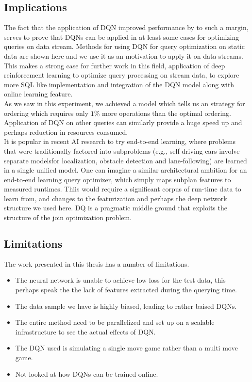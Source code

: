 \subsection{Implications}
The fact that the application of DQN improved performance by to such a margin, serves to prove that DQNs can be applied in at least some cases for optimizing queries on data stream. Methods for using DQN for query optimization on static data are shown here \cite{drl_dbms} and we use it as an motivation to apply it on data streams.  \\
This makes a strong case for further work in this field, application of deep reinforcement learning to optimize query processing on stream data, to explore more SQL like implementation and integration of the DQN model along with online learning feature.\\
As we saw in this experiment, we achieved a model which tells us an strategy for ordering which requires only $1\%$ more operations than the optimal ordering. Application of DQN on other queries can similarly provide a huge speed up and perhaps reduction in resources consumed. \\
It is popular in recent AI research to try end-to-end learning, where problems that were traditionally factored into subproblems (e.g., self-driving cars involve separate modelsfor localization, obstacle detection and lane-following) are learned in a single unified model. One can imagine a similar architectural ambition for an end-to-end learning query optimizer, which simply maps subplan features to measured runtimes. Thiis would require a significant corpus of run-time data to learn from, and changes to the featurization and perhaps the deep network structure we used here. DQ is a pragmatic middle ground that exploits the structure of the join optimization problem\cite{drl_dbms}.

\subsection{Limitations}
The work presented in this thesis has a number of limitations.
\begin{itemize}
    \item The neural network is unable to achieve low loss for the test data, this perhaps speak the the lack of features extracted during the querying time.
    \item The data sample we have is highly biased, leading to rather baised DQNs.
    \item The entire method need to be parallelized and set up on a scalable infrastructure to see the actual effects of DQN.
    \item The DQN used is simulating a single move game rather than a multi move game.
    \item Not looked at how DQNs can be trained online.
\end{itemize}


